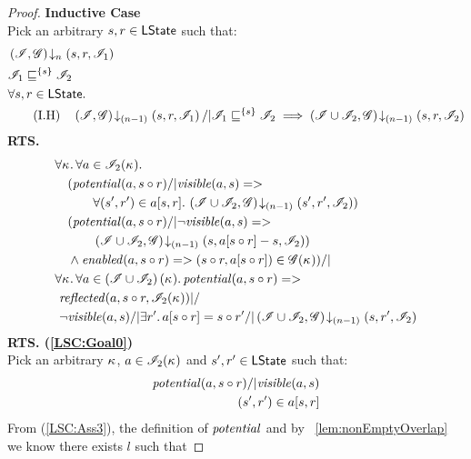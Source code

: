 \begin{lemma}
\begin{proof}
\noindent\textbf{Inductive Case}\\
Pick an arbitrary $s, r \in \textsf{LState}$ such that:
\begin{align}
	&\extendsAMUpto{\lmod, \gmod}{n}{s}{r}{\lmod_1} \label{LSC:Ass1}\\
	&\lmod_1 \weakenI{\{s\}} \lmod_2 \label{LSC:Ass2}\\
%		
	&	\for{s, r \in \LStates}  \nonumber\\
	& \tag{I.H} 
		\quad \extendsAMUpto{\lmod, \gmod}{(n-1)}{s}{r}{\lmod_1} /| \lmod_1 \weakenI{\{s\}} \lmod_2 \implies \extendsAMUpto{\lmod \cup \lmod_2, \gmod}{(n-1)}{s}{r}{\lmod_2} \label{LSC:IH}
\end{align}
%
\textbf{RTS. } 
%
\begin{align}
	& 
	\V{\ca{}}  \V{a\in \lmod_2(\ca{})} \nonumber \\
  &\quad (\m{potential}(a,s \composeL r) /| \m{visible}(a, s) => \nonumber\\
  & \quad\qquad\for{(s', r') \in a[s, r]} \extendsAMUpto{\lmod \cup \lmod_2, \gmod}{(n-1)}{s'}{r'}{\lmod_2}) \label{LSC:Goal0}\\
% 
	&\quad (\m{potential}(a,s \composeL r) /| \neg\m{visible}(a, s) => \nonumber\\
  & \quad\qquad \extendsAMUpto{\lmod \cup \lmod_2, \gmod}{(n-1)}{s}{a[s \composeL r] - s}{\lmod_2}) \label{LSC:Goal1}\\
%   
  &\quad\land \m{enabled}(a,s \composeL r)
  => (s\composeL r, a[s \composeL r])\in \gmod(\ca{}))
  /|\null \label{LSC:Goal2}\\
%  
  &\V{\ca{}}\V{a\in \left(\lmod \cup \lmod_2 \right) (\ca{})}
  \m{potential}(a,s \composeL r) =>\null \nonumber \\
  &\ \m{reflected}(a,s \composeL r,\lmod_2(\ca{})) |/\null \nonumber \\
%  
  &\ \neg\m{visible}(a,s) /| \exsts{r'} a[s \composeL r] = s \composeL r' /| \extendsAMUpto{\lmod \cup \lmod_2, \gmod}{(n-1)}{s}{r'}{\lmod_2}  \label{LSC:Goal3}
\end{align}
%
\noindent\textbf{RTS. (\ref{LSC:Goal0})} \\
Pick an arbitrary $\kappa_{}$, $a \in \mathscr{I}_2(\kappa_{})$ and $s', r' \in \textsf{LState}$ such that:
\begin{align}
	\mathit{potential}(a, s \circ r) /| \mathit{visible}(a, s) \label{LSC:Ass3}\\
	(s', r') \in a[s, r] \label{LSC:Ass4}
\end{align}
From (\ref{LSC:Ass3}), the definition of $\mathit{potential}$ and by \lem~\ref{lem:nonEmptyOverlap} we know there exists $l$ such that 

\end{proof}
\end{lemma}
